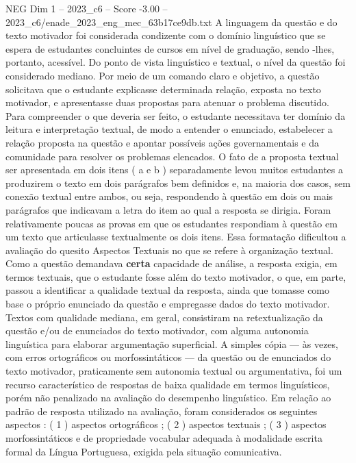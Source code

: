 \begin{textsample}{NEG Dim 1 – 2023\_c6 – Score -3.00 – 2023\_c6/enade\_2023\_eng\_mec\_63b17ce9db.txt}
A linguagem da questão e do texto motivador foi considerada condizente com o domínio linguístico que se espera de estudantes concluintes de cursos em nível de graduação, sendo -lhes, portanto, acessível.
Do ponto de vista linguístico e textual, o nível da questão foi considerado mediano.
Por meio de um comando claro e objetivo, a questão solicitava que o estudante explicasse determinada relação, exposta no texto motivador, e apresentasse duas propostas para atenuar o problema discutido.
Para compreender o que deveria ser feito, o estudante necessitava ter domínio da leitura e interpretação textual, de modo a entender o enunciado, estabelecer a relação proposta na questão e apontar possíveis ações governamentais e da comunidade para resolver os problemas elencados.
O fato de a proposta textual ser apresentada em dois itens ( a e b ) separadamente levou muitos estudantes a produzirem o texto em dois parágrafos bem definidos e, na maioria dos casos, sem conexão textual entre ambos, ou seja, respondendo à questão em dois ou mais parágrafos que indicavam a letra do item ao qual a resposta se dirigia.
Foram relativamente poucas as provas em que os estudantes respondiam à questão em um texto que articulasse textualmente os dois itens.
Essa formatação dificultou a avaliação do quesito Aspectos Textuais no que se refere à organização textual.
Como a questão demandava \textbf{certa} capacidade de análise, a resposta exigia, em termos textuais, que o estudante fosse além do texto motivador, o que, em parte, passou a identificar a qualidade textual da resposta, ainda que tomasse como base o próprio enunciado da questão e empregasse dados do texto motivador.
Textos com qualidade mediana, em geral, consistiram na retextualização da questão e/ou de enunciados do texto motivador, com alguma autonomia linguística para elaborar argumentação superficial.
A simples cópia — às vezes, com erros ortográficos ou morfossintáticos — da questão ou de enunciados do texto motivador, praticamente sem autonomia textual ou argumentativa, foi um recurso característico de respostas de baixa qualidade em termos linguísticos, porém não penalizado na avaliação do desempenho linguístico.
Em relação ao padrão de resposta utilizado na avaliação, foram considerados os seguintes aspectos : ( 1 ) aspectos ortográficos ; ( 2 ) aspectos textuais ; ( 3 ) aspectos morfossintáticos e de propriedade vocabular adequada à modalidade escrita formal da Língua Portuguesa, exigida pela situação comunicativa.

\end{textsample}
